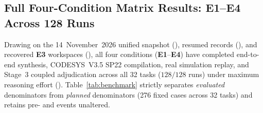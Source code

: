 \subsection{Full Four-Condition Matrix Results: E1--E4 Across 128 Runs}
Drawing on the 14~November~2026 unified snapshot (), resumed  records (), and recovered \textbf{E3} workspaces (), all four conditions (\textbf{E1}--\textbf{E4}) have completed end-to-end synthesis, CODESYS~V3.5 SP22 compilation, real  simulation replay, and Stage~3 coupled  adjudication across all 32 tasks ($128/128$ runs) under maximum reasoning effort (). Table~\ref{tab:benchmark} strictly separates \emph{evaluated} denominators from \emph{planned} denominators (276 fixed cases across 32 tasks) and retains pre-  and  events unaltered.

